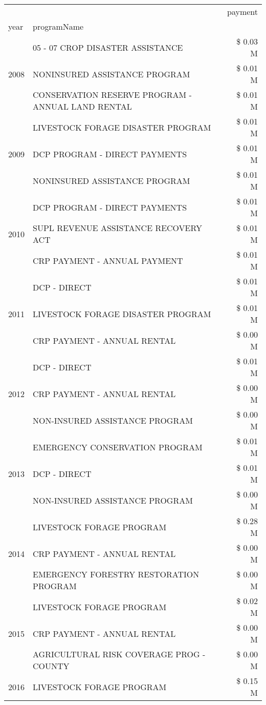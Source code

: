 \begin{tabular}{llr}
\toprule
 &  & payment \\
year & programName &  \\
\midrule
\multirow[t]{3}{*}{2008} & 05 - 07 CROP DISASTER ASSISTANCE & \$ 0.03 M \\
 & NONINSURED ASSISTANCE PROGRAM & \$ 0.01 M \\
 & CONSERVATION RESERVE PROGRAM - ANNUAL LAND RENTAL & \$ 0.01 M \\
\cline{1-3}
\multirow[t]{3}{*}{2009} & LIVESTOCK FORAGE DISASTER  PROGRAM & \$ 0.01 M \\
 & DCP PROGRAM - DIRECT PAYMENTS & \$ 0.01 M \\
 & NONINSURED ASSISTANCE PROGRAM & \$ 0.01 M \\
\cline{1-3}
\multirow[t]{3}{*}{2010} & DCP PROGRAM - DIRECT PAYMENTS & \$ 0.01 M \\
 & SUPL REVENUE ASSISTANCE RECOVERY ACT & \$ 0.01 M \\
 & CRP PAYMENT - ANNUAL PAYMENT & \$ 0.01 M \\
\cline{1-3}
\multirow[t]{3}{*}{2011} & DCP - DIRECT & \$ 0.01 M \\
 & LIVESTOCK FORAGE DISASTER PROGRAM & \$ 0.01 M \\
 & CRP PAYMENT - ANNUAL RENTAL & \$ 0.00 M \\
\cline{1-3}
\multirow[t]{3}{*}{2012} & DCP - DIRECT & \$ 0.01 M \\
 & CRP PAYMENT - ANNUAL RENTAL & \$ 0.00 M \\
 & NON-INSURED ASSISTANCE PROGRAM & \$ 0.00 M \\
\cline{1-3}
\multirow[t]{3}{*}{2013} & EMERGENCY CONSERVATION PROGRAM & \$ 0.01 M \\
 & DCP - DIRECT & \$ 0.01 M \\
 & NON-INSURED ASSISTANCE PROGRAM & \$ 0.00 M \\
\cline{1-3}
\multirow[t]{3}{*}{2014} & LIVESTOCK FORAGE PROGRAM & \$ 0.28 M \\
 & CRP PAYMENT - ANNUAL RENTAL & \$ 0.00 M \\
 & EMERGENCY FORESTRY RESTORATION PROGRAM & \$ 0.00 M \\
\cline{1-3}
\multirow[t]{3}{*}{2015} & LIVESTOCK FORAGE PROGRAM & \$ 0.02 M \\
 & CRP PAYMENT - ANNUAL RENTAL & \$ 0.00 M \\
 & AGRICULTURAL RISK COVERAGE PROG - COUNTY & \$ 0.00 M \\
\cline{1-3}
\multirow[t]{3}{*}{2016} & LIVESTOCK FORAGE PROGRAM                      & \$ 0.15 M \\

\end{tabular}
